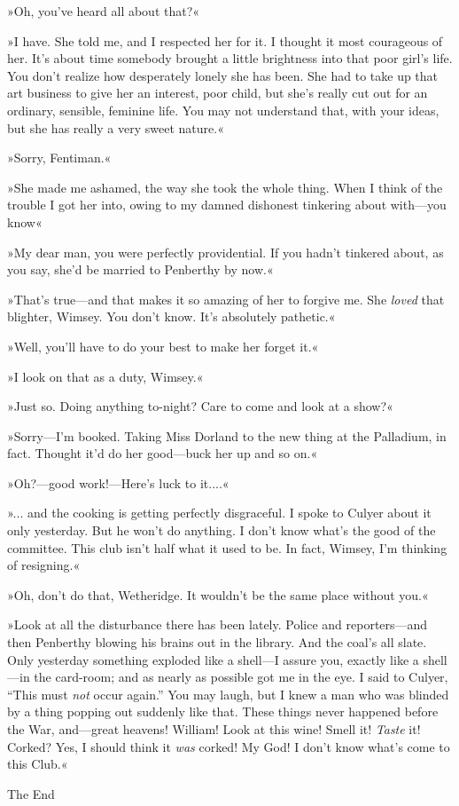 »Oh, you've heard all about that?«

»I have. She told me, and I respected her for it. I thought it most courageous of her. It's about time somebody brought a little brightness into that poor girl's life. You don't realize how desperately lonely she has been. She had to take up that art business to give her an interest, poor child, but she's really cut out for an ordinary, sensible, feminine life. You may not understand that, with your ideas, but she has really a very sweet nature.«

»Sorry, Fentiman.«

»She made me ashamed, the way she took the whole thing. When I think of the trouble I got her into, owing to my damned dishonest tinkering about with\allowbreak---\allowbreak you know\longdash«

»My dear man, you were perfectly providential. If you hadn't tinkered about, as you say, she'd be married to Penberthy by now.«

»That's true\allowbreak---\allowbreak and that makes it so amazing of her to forgive me. She \textit{loved} that blighter, Wimsey. You don't know. It's absolutely pathetic.«

»Well, you'll have to do your best to make her forget it.«

»I look on that as a duty, Wimsey.«

»Just so. Doing anything to-night? Care to come and look at a show?«

»Sorry\allowbreak---\allowbreak I'm booked. Taking Miss Dorland to the new thing at the Palladium, in fact. Thought it'd do her good\allowbreak---\allowbreak buck her up and so on.«

»Oh?\allowbreak---\allowbreak good work!\allowbreak---\allowbreak Here's luck to it....«

»... and the cooking is getting perfectly disgraceful. I spoke to Culyer about it only yesterday. But he won't do anything. I don't know what's the good of the committee. This club isn't half what it used to be. In fact, Wimsey, I'm thinking of resigning.«

»Oh, don't do that, Wetheridge. It wouldn't be the same place without you.«

»Look at all the disturbance there has been lately. Police and reporters\allowbreak---\allowbreak and then Penberthy blowing his brains out in the library. And the coal's all slate. Only yesterday something exploded like a shell\allowbreak---\allowbreak I assure you, exactly like a shell\allowbreak---\allowbreak in the card-room; and as nearly as possible got me in the eye. I said to Culyer, \enquote{This must \textit{not} occur again.} You may laugh, but I knew a man who was blinded by a thing popping out suddenly like that. These things never happened before the War, and\allowbreak---\allowbreak great heavens! William! Look at this wine! Smell it! \textit{Taste} it! Corked? Yes, I should think it \textit{was} corked! My God! I don't know what's come to this Club.«
\vfill
\begin{center}
{\mytitlefont\moderatelyhuge The End}
\end{center}